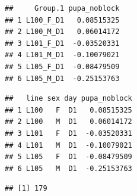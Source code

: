\documentclass[
]{article}
\newenvironment{Shaded}{\begin{snugshade}}{\end{snugshade}}
\newcommand{\CommentTok}[1]{\textcolor[rgb]{0.56,0.35,0.01}{\textit{#1}}}
\newcommand{\DecValTok}[1]{\textcolor[rgb]{0.00,0.00,0.81}{#1}}
\newcommand{\FloatTok}[1]{\textcolor[rgb]{0.00,0.00,0.81}{#1}}
\newcommand{\KeywordTok}[1]{\textcolor[rgb]{0.13,0.29,0.53}{\textbf{#1}}}
\newcommand{\NormalTok}[1]{#1}
\newcommand{\OperatorTok}[1]{\textcolor[rgb]{0.81,0.36,0.00}{\textbf{#1}}}
\newcommand{\StringTok}[1]{\textcolor[rgb]{0.31,0.60,0.02}{#1}}
\begin{document}
\begin{Shaded}
\end{Shaded}

\begin{verbatim}
##     Group.1 pupa_noblock
## 1 L100_F_D1   0.08515325
## 2 L100_M_D1   0.06014172
## 3 L101_F_D1  -0.03520331
## 4 L101_M_D1  -0.10079021
## 5 L105_F_D1  -0.08479509
## 6 L105_M_D1  -0.25153763
\end{verbatim}

\begin{Shaded}
\end{Shaded}

\begin{verbatim}
##   line sex day pupa_noblock
## 1 L100   F  D1   0.08515325
## 2 L100   M  D1   0.06014172
## 3 L101   F  D1  -0.03520331
## 4 L101   M  D1  -0.10079021
## 5 L105   F  D1  -0.08479509
## 6 L105   M  D1  -0.25153763
\end{verbatim}

\begin{Shaded}
\end{Shaded}

\begin{verbatim}
## [1] 179
\end{verbatim}
\end{document}
